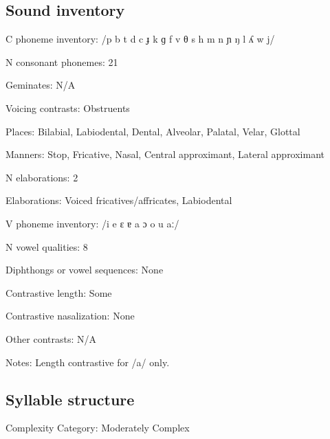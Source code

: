 {\subsection*{Sound inventory}
\begin{appendixdesc}

\item[C phoneme inventory:] /p b t d c ɟ k ɡ f v θ s h m n ɲ ŋ l ʎ w j/

\item[N consonant phonemes:] 21

\item[Geminates:] N/A

\item[Voicing contrasts:] Obstruents

\item[Places:] Bilabial, Labiodental, Dental, Alveolar, Palatal, Velar, Glottal

\item[Manners:] Stop, Fricative, Nasal, Central approximant, Lateral approximant

\item[N elaborations:] 2

\item[Elaborations:] Voiced fricatives/affricates, Labiodental

\item[V phoneme inventory:] /i e ɛ ɐ a ɔ o u aː/

\item[N vowel qualities:] 8

\item[Diphthongs or vowel sequences:] None

\item[Contrastive length:] Some

\item[Contrastive nasalization:] None

\item[Other contrasts:] N/A

\item[Notes:] Length contrastive for /a/ only.
\end{appendixdesc}
\subsection*{Syllable structure}
\begin{appendixdesc}

\item[Complexity Category:] Moderately Complex


\end{appendixdesc}}
